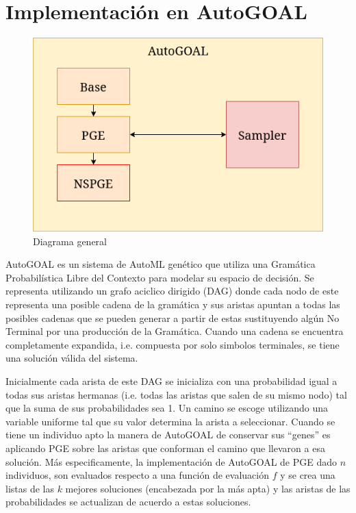 \section{Implementaci\'on en AutoGOAL}

\begin{figure}[ht]
    \centering
    \includegraphics[scale=0.6]{Pictures/autogoal_impl.png}
    \caption{Diagrama general}
    \label{impl:fig:general_diagram}
\end{figure}


AutoGOAL es un sistema de AutoML gen\'etico que utiliza una Gram\'atica Probabil\'istica Libre del Contexto  para modelar su espacio de decisi\'on. Se representa utilizando un grafo aciclico dirigido (DAG) donde cada nodo de este representa una posible cadena de la gram\'atica y sus aristas apuntan a todas las posibles cadenas que se pueden generar a partir de estas sustituyendo alg\'un No Terminal por una producci\'on de la Gram\'atica. Cuando una cadena se encuentra completamente expandida, i.e. compuesta por solo simbolos terminales, se tiene una soluci\'on v\'alida del sistema. 

Inicialmente cada arista de este DAG se inicializa con una probabilidad igual a todas sus aristas hermanas (i.e. todas las aristas que salen de su mismo nodo) tal que la suma de sus probabilidades sea 1. Un camino se escoge utilizando una variable uniforme tal que su valor determina la arista a seleccionar. Cuando se tiene un individuo apto la manera de AutoGOAL de conservar sus ``genes'' es aplicando PGE sobre las aristas que conforman el camino que llevaron a esa soluci\'on. M\'as especificamente, la implementaci\'on de AutoGOAL de PGE dado $n$ individuos, son evaluados respecto a una funci\'on de evaluaci\'on $f$ y se crea una listas de las $k$ mejores soluciones (encabezada por la m\'as apta) y las aristas de las probabilidades se actualizan de acuerdo a estas soluciones. 


